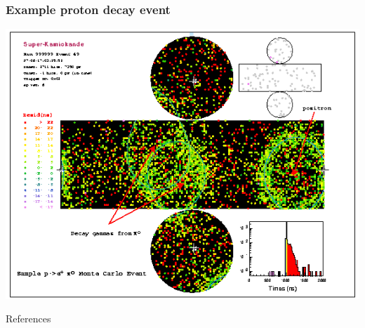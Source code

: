\documentclass[english, fleqn]{beamer}
\begin{document}
\begin{frame}
    \frametitle{}

\end{frame}

\begin{frame}
    \frametitle{Example proton decay event}

    \centering
    \includegraphics[width=0.9\linewidth]{Figures/epi0_nice_event.png}
\end{frame}

\begin{frame}
    References

    \printbibliography
\end{frame}
\end{document}
